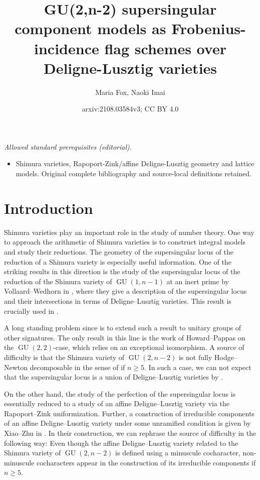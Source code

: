 \documentclass[12pt,a4paper]{article}
\title{GU(2,n-2) supersingular component models as Frobenius-incidence flag schemes over Deligne-Lusztig varieties}
\author{Maria Fox, Naoki Imai}
\date{arxiv:2108.03584v3; CC BY 4.0}
\DeclareMathOperator{\GU}{GU}
\begin{document}
\maketitle
\noindent\textit{Allowed standard prerequisites (editorial).}\begin{itemize}
\item Shimura varieties, Rapoport-Zink/affine Deligne-Lusztig geometry and lattice models. Original complete bibliography and source-local definitions retained.
\end{itemize}\medskip
\section{Introduction}
Shimura varieties play an important role in the study of number theory. 
One way to approach the arithmetic of Shimura varieties is 
to construct integral models and study their reductions. 
The geometry of the supersingular locus of the reduction of a Shimura variety is especially useful information.
One of the striking results in this direction is the study of 
the supersingular locus of the reduction of the Shimura variety of $\GU (1,n-1)$ 
at an inert prime by Vollaard--Wedhorn in \cite{VoWeGUII}, 
where they give a description of 
the supersingular locus and their intersections in terms of 
Deligne--Lusztig varieties. 
This result is crucially used in \cite{KuRaSpuniI}. 

A long standing problem since \cite{VoWeGUII} 
is to extend such a result to unitary groups of 
other signatures. 
The only result in this line is the work \cite{HoPaGU22} of Howard--Pappas on the $\GU (2,2)$-case, which relies on an exceptional isomorphism.
A source of difficulty is that 
the Shimura variety of $\GU (2,n-2)$ is 
not fully Hodge--Newton decomposable 
in the sense of \cite[Definition 3.1]{GHNFulHN} 
if $n \geq 5$. 
In such a case, 
we can not expect that 
the supersingular locus is a union of Deligne--Lusztig varieties by \cite[Theorem B]{GHNFulHN}. 

On the other hand, 
the study of the perfection of the supersingular locus is essentially reduced to a study of an affine Deligne--Lusztig variety via 
the Rapoport--Zink uniformization. 
Further, a construction of irreducible components of an 
affine Deligne--Lusztig variety under some unramified condition is given by Xiao--Zhu in \cite{XiZhCycSh}. 
In their construction, we can rephrase the source of difficulty in the following way: 
Even though the affine Deligne--Lusztig variety 
related to the Shimura variety of $\GU (2,n-2)$ 
is defined using a minuscule cocharacter, 
non-minuscule cocharacters appear in 
the construction of 
its irreducible components if $n \geq 5$. 
\end{document}
